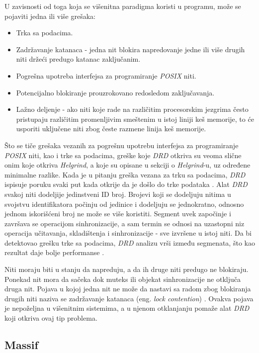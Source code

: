 \documentclass[12pt,oneside]{memoir}
\theoremstyle{plain}
\theoremstyle{definition}
\begin{document}
U zavisnosti od toga koja se višenitna paradigma koristi u programu, može se pojaviti jedna ili više grešaka:
\begin{itemize}
\item Trka sa podacima.
\item Zadržavanje katanaca - jedna nit blokira napredovanje jedne ili više drugih niti držeći predugo katanac zaključanim.
\item Pogrešna upotreba interfejsa za programiranje \textit{POSIX} niti.
\item Potencijalno blokiranje prouzrokovano redosledom zaključavanja.
\item Lažno deljenje - ako niti koje rade na različitim procesorskim jezgrima često pristupaju različitim promenljivim smeštenim u istoj liniji keš memorije, to će usporiti uključene niti zbog česte razmene linija keš memorije.
\end{itemize} 

Što se tiče grešaka vezanih za pogrešnu upotrebu interfejsa za programiranje \textit{POSIX} niti, kao i trke sa podacima, greške koje \textit{DRD} otkriva su veoma slične onim koje otkriva \textit{Helgrind}, a koje su opisane u sekciji o \textit{Helgrind}-u, uz određene minimalne razlike. Kada je u pitanju greška vezana za trku sa podacima, \textit{DRD} ispisuje poruku svaki put kada otkrije da je došlo do trke podataka \cite{Drd}. Alat \textit{DRD} svakoj niti dodeljije jedinstveni ID broj. Brojevi koji se dodeljuju nitima u svojstvu identifikatora počinju od jedinice i dodeljuju se jednokratno, odnosno jednom iskorišćeni broj ne može se više koristiti. Segment uvek započinje i završava se operacijom sinhronizacije, a sam termin se odnosi na uzastopni niz operacija učitavanja, skladištenja i sinhronizacije - sve izvršene u istoj niti. Da bi detektovao grešku trke sa podacima, \textit{DRD} analizu vrši između segmenata, što kao rezultat daje bolje performanse \cite{Drd}.

Niti moraju biti u stanju da napreduju, a da ih druge niti predugo ne blokiraju. Ponekad nit mora da sačeka dok muteks ili objekat sinhronizacije ne otključa druga nit. Pojava u kojoj jedna nit ne može da nastavi sa radom zbog blokiranja drugih niti naziva se zadržavanje katanaca (eng. \textit{lock contention})  \cite{Drd}. Ovakva pojava je nepoželjna u višenitnim sistemima, a u njenom otklanjanju pomaže alat \textit{DRD} koji otkriva ovaj tip problema. 

\subsection{Massif}
\end{document}
